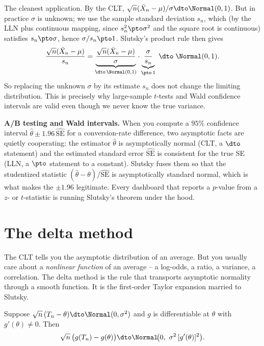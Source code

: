 \begin{example}
\label{ch22:ex-tstat}
The cleanest application. By the CLT,
$\sqrt n(\bar X_n - \mu)/\sigma \dto \Normal(0,1)$. But in practice $\sigma$ is
unknown; we use the sample standard deviation $s_n$, which (by the LLN plus continuous
mapping, since $s_n^2\pto\sigma^2$ and the square root is continuous) satisfies
$s_n\pto\sigma$, hence $\sigma/s_n\pto1$. Slutsky's product rule then gives
\[
  \frac{\sqrt n(\bar X_n - \mu)}{s_n}
  = \underbrace{\frac{\sqrt n(\bar X_n - \mu)}{\sigma}}_{\dto\,\Normal(0,1)}
    \cdot
    \underbrace{\frac{\sigma}{s_n}}_{\pto\,1}
  \;\dto\; \Normal(0,1).
\]
So replacing the unknown $\sigma$ by its estimate $s_n$ does not change the limiting
distribution. This is precisely why large-sample $t$-tests and Wald confidence
intervals are valid even though we never know the true variance.
\end{example}

\begin{applicationbox}
\textbf{A/B testing and Wald intervals.} When you compute a $95\%$ confidence interval
$\hat\theta \pm 1.96\,\widehat{\mathrm{SE}}$ for a conversion-rate difference, two
asymptotic facts are quietly cooperating: the estimator $\hat\theta$ is asymptotically
normal (CLT, a $\dto$ statement) and the estimated standard error
$\widehat{\mathrm{SE}}$ is consistent for the true SE (LLN, a $\pto$ statement to a
constant). Slutsky fuses them so that the studentized statistic
$(\hat\theta-\theta)/\widehat{\mathrm{SE}}$ is asymptotically standard normal, which
is what makes the $\pm1.96$ legitimate. Every dashboard that reports a $p$-value from
a $z$- or $t$-statistic is running Slutsky's theorem under the hood.
\end{applicationbox}

\section{The delta method}
\label{ch22:delta}

The CLT tells you the asymptotic distribution of an average. But you usually care
about a \emph{nonlinear function} of an average -- a log-odds, a ratio, a variance, a
correlation. The delta method is the rule that transports asymptotic normality through
a smooth function. It is the first-order Taylor expansion married to Slutsky.

\begin{theorem}
\label{ch22:thm-delta}
Suppose $\sqrt n\,(T_n - \theta) \dto \Normal(0,\sigma^2)$ and $g$ is differentiable
at $\theta$ with $g'(\theta)\ne0$. Then
\[
  \sqrt n\,\big(g(T_n) - g(\theta)\big) \dto \Normal\!\big(0,\ \sigma^2\,[g'(\theta)]^2\big).
\]
\end{theorem}


